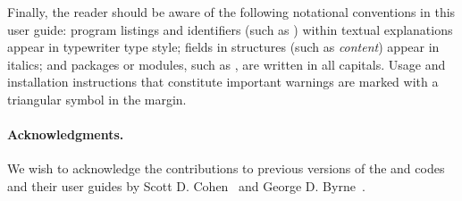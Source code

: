 Finally, the reader should be aware of the following notational conventions
in this user guide:  program listings and identifiers (such as )
within textual explanations appear in typewriter type style;
fields in {\CC} structures (such as {\em content}) appear in italics;
and packages or modules, such as {\cvls}, are written in all capitals.
Usage and installation instructions that constitute important warnings
are marked with a triangular symbol {\warn} in the margin.

\paragraph{Acknowledgments.}
We wish to acknowledge the contributions to previous versions of the
{\cvode} and {\pvode} codes and their user guides by Scott D. Cohen~\cite{CoHi:94}
and George D. Byrne~\cite{ByHi:98}.


